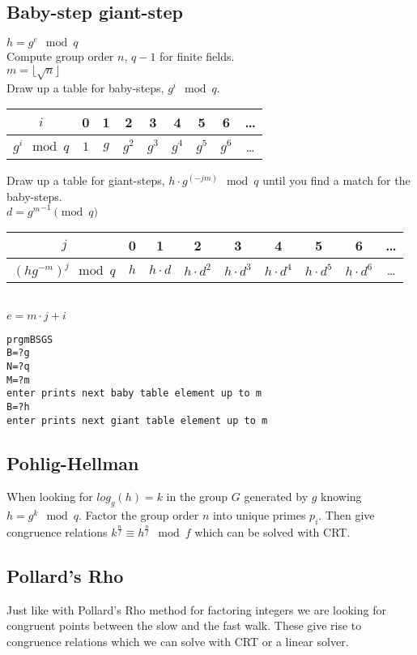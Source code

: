 \documentclass{article}
\begin{document}
\subsection{Baby-step giant-step}
$h = g^e \mod q$ \\
Compute group order $n$, $q-1$ for finite fields. \\
$m = \lfloor \sqrt{n} \rfloor$\\

Draw up a table for baby-steps, $g^i \mod q$.\\
\begin{tabular}{|c|c|c|c|c|c|c|c|c|}
\hline
$i $ & 0 & 1 & 2 & 3 & 4 & 5 & 6 & \ldots \\
\hline
$g^i \mod q$ & $1$ & $g$ & $g^2$ & $g^3$ & $g^4$ & $g^5$ & $g^6$ & \ldots \\
\hline
\end{tabular}

Draw up a table for giant-steps, $h \cdot g^(-jm) \mod q$ until you find a match for the baby-steps.\\
$d = {g^m}^{-1} \pmod{q}$\\
\begin{tabular}{|c|c|c|c|c|c|c|c|c|}
\hline
$j $ & 0 & 1 & 2 & 3 & 4 & 5 & 6 & \ldots \\
\hline
$(hg^{-m})^j \mod q$ & $h$ & $h \cdot d$ & $h \cdot d^2$ & $h \cdot d^3$ & $h \cdot d^4$ & $h \cdot d^5$ & $h \cdot d^6$ & \ldots \\
\hline
\end{tabular} \\
$e = m \cdot j + i$

\begin{verbatim}
prgmBSGS
B=?g
N=?q
M=?m
enter prints next baby table element up to m
B=?h
enter prints next giant table element up to m
\end{verbatim}


\subsection{Pohlig-Hellman}
When looking for $log_g(h) = k$ in the group $G$ generated by $g$ knowing $h =
g^k \mod q$.
Factor the group order $n$ into unique primes $p_i$.
Then give congruence relations $k^{\frac{n}{f}} \equiv h^{\frac{n}{f}} \mod f$
which can be solved with CRT.

\subsection{Pollard's Rho}
Just like with Pollard's Rho method for factoring integers we are looking for
congruent points between the slow and the fast walk. These give rise to congruence
relations which we can solve with CRT or a linear solver.
\end{document}
